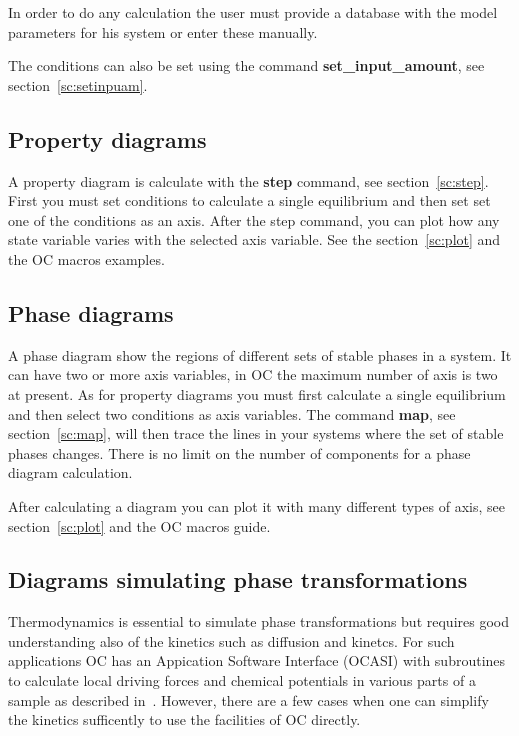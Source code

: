 \documentclass[11pt]{article}
\begin{document}
In order to do any calculation the user must provide a database with
the model parameters for his system or enter these manually.

The conditions can also be set using the command {\bf
  set\_input\_amount}, see section~\ref{sc:setinpuam}.

\hypertarget{Info propertydiagram}{}
\subsection{Property diagrams}\label{sc:propertydia}

A property diagram is calculate with the {\bf step} command, see
section~\ref{sc:step}.  First you must set conditions to calculate a
single equilibrium and then set set one of the conditions as an axis.
After the step command, you can plot how any state variable varies
with the selected axis variable.  See the section~\ref{sc:plot} and
the OC macros examples.

\hypertarget{Info phasediagram}{}
\subsection{Phase diagrams}\label{sc:phasedia}

A phase diagram show the regions of different sets of stable phases in
a system.  It can have two or more axis variables, in OC the maximum
number of axis is two at present.  As for property diagrams you must
first calculate a single equilibrium and then select two conditions as
axis variables.  The command {\bf map}, see section~\ref{sc:map}, will
then trace the lines in your systems where the set of stable phases
changes.  There is no limit on the number of components for a phase
diagram calculation.

After calculating a diagram you can plot it with many different types
of axis, see section~\ref{sc:plot} and the OC macros guide.

\subsection{Diagrams simulating phase transformations}

Thermodynamics is essential to simulate phase transformations but
requires good understanding also of the kinetics such as diffusion and
kinetcs.  For such applications OC has an Appication Software
Interface (OCASI) with subroutines to calculate local driving forces
and chemical potentials in various parts of a sample as described
in~\cite{16Sun,20Her}.  However, there are a few cases when one can
simplify the kinetics sufficently to use the facilities of OC
directly.
\end{document}
